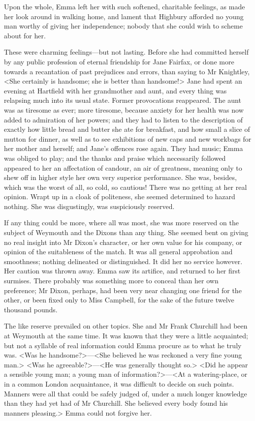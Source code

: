 Upon the whole, Emma left her with such softened, charitable feelings, as made her look around in walking home, and lament that Highbury afforded no young man worthy of giving her independence; nobody that she could wish to scheme about for her.

These were charming feelings—but not lasting. Before she had committed herself by any public profession of eternal friendship for Jane Fairfax, or done more towards a recantation of past prejudices and errors, than saying to Mr Knightley, <She certainly is handsome; she is better than handsome!> Jane had spent an evening at Hartfield with her grandmother and aunt, and every thing was relapsing much into its usual state. Former provocations reappeared. The aunt was as tiresome as ever; more tiresome, because anxiety for her health was now added to admiration of her powers; and they had to listen to the description of exactly how little bread and butter she ate for breakfast, and how small a slice of mutton for dinner, as well as to see exhibitions of new caps and new workbags for her mother and herself; and Jane's offences rose again. They had music; Emma was obliged to play; and the thanks and praise which necessarily followed appeared to her an affectation of candour, an air of greatness, meaning only to shew off in higher style her own very superior performance. She was, besides, which was the worst of all, so cold, so cautious! There was no getting at her real opinion. Wrapt up in a cloak of politeness, she seemed determined to hazard nothing. She was disgustingly, was suspiciously reserved.

If any thing could be more, where all was most, she was more reserved on the subject of Weymouth and the Dixons than any thing. She seemed bent on giving no real insight into Mr Dixon's character, or her own value for his company, or opinion of the suitableness of the match. It was all general approbation and smoothness; nothing delineated or distinguished. It did her no service however. Her caution was thrown away. Emma saw its artifice, and returned to her first surmises. There probably was something more to conceal than her own preference; Mr Dixon, perhaps, had been very near changing one friend for the other, or been fixed only to Miss Campbell, for the sake of the future twelve thousand pounds.

The like reserve prevailed on other topics. She and Mr Frank Churchill had been at Weymouth at the same time. It was known that they were a little acquainted; but not a syllable of real information could Emma procure as to what he truly was. <Was he handsome?>—<She believed he was reckoned a very fine young man.> <Was he agreeable?>—<He was generally thought so.> <Did he appear a sensible young man; a young man of information?>—<At a watering-place, or in a common London acquaintance, it was difficult to decide on such points. Manners were all that could be safely judged of, under a much longer knowledge than they had yet had of Mr Churchill. She believed every body found his manners pleasing.> Emma could not forgive her.